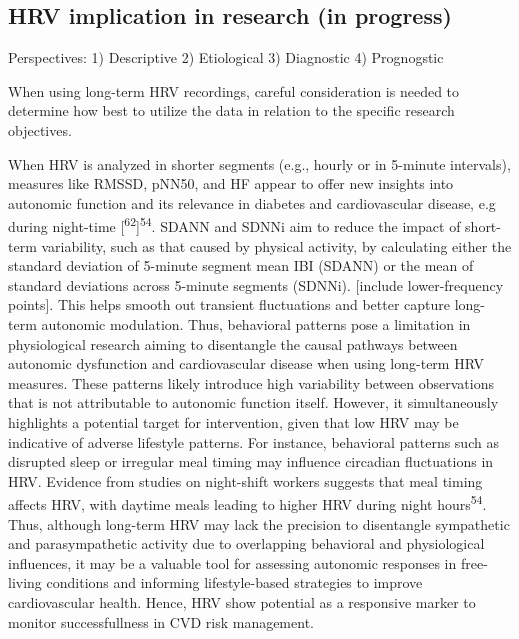 \documentclass[
  a4paper,
  headsepline=true,
  open=any]{scrbook}
\begin{document}
\hypertarget{hrv-implication-in-research-in-progress}{%
\subsection{HRV implication in research (in
progress)}\label{hrv-implication-in-research-in-progress}}

Perspectives: 1) Descriptive 2) Etiological 3) Diagnostic 4) Prognogstic

When using long-term HRV recordings, careful consideration is needed to
determine how best to utilize the data in relation to the specific
research objectives.

When HRV is analyzed in shorter segments (e.g., hourly or in 5-minute
intervals), measures like RMSSD, pNN50, and HF appear to offer new
insights into autonomic function and its relevance in diabetes and
cardiovascular disease, e.g during night-time
{[}\textsuperscript{62}{]}\textsuperscript{54}. SDANN and SDNNi aim to
reduce the impact of short-term variability, such as that caused by
physical activity, by calculating either the standard deviation of
5-minute segment mean IBI (SDANN) or the mean of standard deviations
across 5-minute segments (SDNNi). {[}include lower-frequency points{]}.
This helps smooth out transient fluctuations and better capture
long-term autonomic modulation. Thus, behavioral patterns pose a
limitation in physiological research aiming to disentangle the causal
pathways between autonomic dysfunction and cardiovascular disease when
using long-term HRV measures. These patterns likely introduce high
variability between observations that is not attributable to autonomic
function itself. However, it simultaneously highlights a potential
target for intervention, given that low HRV may be indicative of adverse
lifestyle patterns. For instance, behavioral patterns such as disrupted
sleep or irregular meal timing may influence circadian fluctuations in
HRV. Evidence from studies on night-shift workers suggests that meal
timing affects HRV, with daytime meals leading to higher HRV during
night hours\textsuperscript{54}. Thus, although long-term HRV may lack
the precision to disentangle sympathetic and parasympathetic activity
due to overlapping behavioral and physiological influences, it may be a
valuable tool for assessing autonomic responses in free-living
conditions and informing lifestyle-based strategies to improve
cardiovascular health. Hence, HRV show potential as a responsive marker
to monitor successfullness in CVD risk management.
\end{document}
